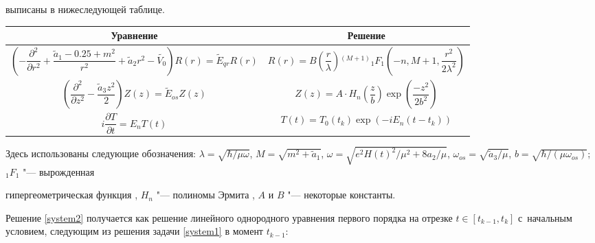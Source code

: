 выписаны в нижеследующей таблице.



\medskip



{\footnotesize \noindent


\begin{tabular}{c|c}

  \hline

\rule{0mm}{11pt}%

\small  Уравнение & \small Решение \\

  \hline

\rule{0mm}{20pt}%

$\left(-\dfrac{\partial^2}{\partial r^2}{+}\dfrac{\tilde{a}_1{-}0.25{+}m^2}{r^2}{+}\tilde{a}_2 r^2{-}\tilde{V_0}\right)\!R(r){=}\tilde{E}_{qr}R(r)$ & $R(r){=}B\!\left(\dfrac{r}{\lambda}\right)\!^{(M{+}1)}{_1F_1}\!\left(-n,M{+}1,\dfrac{r^2}{2\lambda^2}\right)\!$ \\


  $\left(\dfrac{\partial^2}{\partial z^2}-\dfrac{\tilde{a}_3z^2}{2}\right)Z(z)=\tilde{E}_{os}Z(z)$ & $Z(z)= A\cdot H_n\left(\dfrac{z}{b}\right)\exp\left(\dfrac{-z^2}{2b^2}\right)$ \\


  $i\dfrac{\partial T}{\partial t}=E_n T(t)$ & $T(t)=T_0(t_k)\exp(-iE_n (t-t_k))$ \\

  \hline

\end{tabular}

}



\medskip





Здесь использованы следующие обозначения: $\lambda = \sqrt{\hbar/{\mu\omega}}$, $M = \sqrt{m^2+\tilde{a}_1}$, $\omega =

\sqrt{e^2H(t)^2/\mu^2+8a_2/\mu}$, $\omega_{os}=\sqrt{\tilde{a}_3/\mu}$, $b = \sqrt{\hbar/(\mu\omega_{os})}$; $_1F_1$ "--- вырожденная

гипергеометрическая функция \cite{Abramovits}, $H_n$ "--- полиномы Эрмита \cite{Abramovits}, $A$ и $B$ "--- некоторые константы.



Решение \eqref{system2} получается как решение линейного однородного уравнения первого порядка \cite{Kamke} на отрезке $t\in[t_{k-1}, t_k]$ с~начальным условием, следующим из решения задачи \eqref{system1} в момент $t_{k-1}$:

